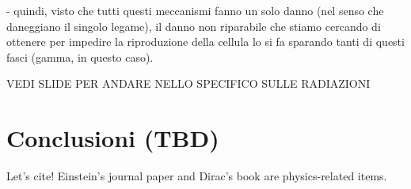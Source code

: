 \documentclass[12pt,a4paper,twoside]{report}
\begin{document}
	- quindi, visto che tutti questi meccanismi fanno un solo danno (nel senso che daneggiano il singolo legame), il danno non riparabile che stiamo cercando di ottenere per impedire la riproduzione della cellula lo si fa sparando tanti di questi fasci (gamma, in questo caso).
	
	VEDI SLIDE PER ANDARE NELLO SPECIFICO SULLE RADIAZIONI
	
	
	
	
	
	
	
	
	
	
	
	


	
	
	
	
			
	\chapter*{Conclusioni (TBD)}
		Let's cite! Einstein's journal paper \cite{einstein} and Dirac's book \cite{dirac} are physics-related items.
	\newpage	
	\printbibliography[
		heading=bibintoc,
		title={Bibliografia}
		]
		 	
\end{document}
